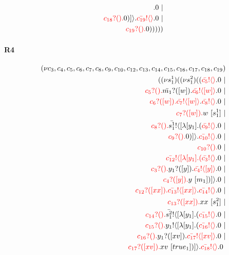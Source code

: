 \documentclass{article}
\begin{document}
\begin{align*}
\color{black}.0  \ | \\ \color{red}c_{18}?().\color{black}0 )] \rangle \color{black}.\color{red}\bar{c_{19}}! \langle  \rangle \color{black}.0  \ | \\ \color{red}c_{19}?().\color{black}0 )))))
\end{align*}
\paragraph{R4}
\begin{align*}
 (\nu c_{3},c_{4},c_{5},c_{6},c_{7},c_{8},c_{9},c_{10},c_{12},c_{13},c_{14},c_{15},c_{16},c_{17},c_{18},c_{19}) \\ ( (\nu s^{1}_{1})( (\nu s^{2}_{1})((\color{red}\bar{c_{5}}! \langle  \rangle \color{black}.0  \ | \\ \color{red}c_{5}?().\color{black}\color{black}\bar{m_{1}}?([w]).\color{black}\color{red}\bar{c_{6}}! \langle [w] \rangle \color{black}.0  \ | \\ \color{red}c_{6}?([w]).\color{black}\color{red}\bar{c_{7}}! \langle [w] \rangle \color{black}.\color{red}\bar{c_{8}}! \langle  \rangle \color{black}.0  \ | \\ \color{red}c_{7}?([w]).\color{black}w \ [s^{1}_{1}] \ | \\ \color{red}c_{8}?().\color{black}\color{black}\bar{s^{1}_{1}}! \langle [ \lambda [y_{1}].(\color{red}\bar{c_{9}}! \langle  \rangle \color{black}.0  \ | \\ \color{red}c_{9}?().\color{black}0 )] \rangle \color{black}.\color{red}\bar{c_{10}}! \langle  \rangle \color{black}.0  \ | \\ \color{red}c_{10}?().\color{black}0  \ | \\ \color{red}\bar{c_{12}}! \langle [ \lambda [y_{1}].(\color{red}\bar{c_{3}}! \langle  \rangle \color{black}.0  \ | \\ \color{red}c_{3}?().\color{black}\color{black}y_{1}?([y]).\color{black}\color{red}\bar{c_{4}}! \langle [y] \rangle \color{black}.0  \ | \\ \color{red}c_{4}?([y]).\color{black}y \ [m_{1}])] \rangle \color{black}.0  \ | \\ \color{red}c_{12}?([xx]).\color{black}\color{red}\bar{c_{13}}! \langle [xx] \rangle \color{black}.\color{red}\bar{c_{14}}! \langle  \rangle \color{black}.0  \ | \\ \color{red}c_{13}?([xx]).\color{black}xx \ [s^{2}_{1}] \ | \\ \color{red}c_{14}?().\color{black}\color{black}\bar{s^{2}_{1}}! \langle [ \lambda [y_{1}].(\color{red}\bar{c_{15}}! \langle  \rangle \color{black}.0  \ | \\ \color{red}c_{15}?().\color{black}\color{black}y_{1}! \langle [ \lambda [y_{1}].(\color{red}\bar{c_{16}}! \langle  \rangle \color{black}.0  \ | \\ \color{red}c_{16}?().\color{black}\color{black}y_{1}?([xv]).\color{black}\color{red}\bar{c_{17}}! \langle [xv] \rangle \color{black}.0  \ | \\ \color{red}c_{17}?([xv]).\color{black}xv \ [true_{1}])] \rangle \color{black}.\color{red}\bar{c_{18}}! \langle  \rangle \color{black}.0  \ 
\end{align*}
\end{document}
